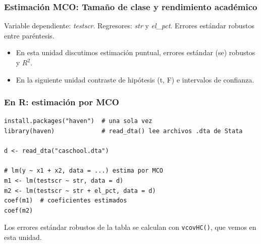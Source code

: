 \documentclass[t, compress, spanish, aspectratio=169]{beamer}
\begin{document}
	\begin{frame}[shrink=5]
			\frametitle{Estimaci\'on MCO: Tama\~no de clase y rendimiento acad\'emico}
			Variable dependiente: \emph{testscr}. Regresores: \emph{str} y \emph{el\_pct}. Errores est\'andar robustos entre par\'entesis.
		\small
		\begin{center}\renewcommand{\arraystretch}{0.8}\end{center}
		\begin{itemize}
			\item En esta unidad discutimos estimaci\'on puntual, errores est\'andar (se) robustos y $R^2$.
			\item En la siguiente unidad contraste de hip\'otesis (t, F) e intervalos de confianza. 
		\end{itemize}
	\end{frame}
\begin{frame}[fragile]
	\frametitle{En R: estimaci\'on por MCO}
\footnotesize
\begin{verbatim}
install.packages("haven")  # una sola vez
library(haven)             # read_dta() lee archivos .dta de Stata

d <- read_dta("caschool.dta")

# lm(y ~ x1 + x2, data = ...) estima por MCO
m1 <- lm(testscr ~ str, data = d)
m2 <- lm(testscr ~ str + el_pct, data = d)
coef(m1)  # coeficientes estimados
coef(m2)
\end{verbatim}
\small
Los errores est\'andar robustos de la tabla se calculan con \texttt{vcovHC()}, que vemos en esta unidad.
\end{frame}
	
\end{document}
